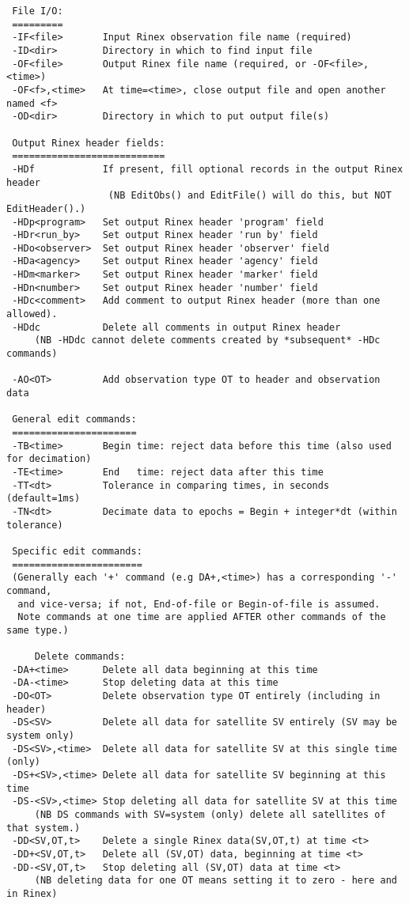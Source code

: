 \begin{\outputsize}
\begin{verbatim}
 File I/O:
 =========
 -IF<file>       Input Rinex observation file name (required)
 -ID<dir>        Directory in which to find input file
 -OF<file>       Output Rinex file name (required, or -OF<file>,<time>)
 -OF<f>,<time>   At time=<time>, close output file and open another named <f>
 -OD<dir>        Directory in which to put output file(s)

 Output Rinex header fields:
 ===========================
 -HDf            If present, fill optional records in the output Rinex header
                  (NB EditObs() and EditFile() will do this, but NOT EditHeader().)
 -HDp<program>   Set output Rinex header 'program' field
 -HDr<run_by>    Set output Rinex header 'run by' field
 -HDo<observer>  Set output Rinex header 'observer' field
 -HDa<agency>    Set output Rinex header 'agency' field
 -HDm<marker>    Set output Rinex header 'marker' field
 -HDn<number>    Set output Rinex header 'number' field
 -HDc<comment>   Add comment to output Rinex header (more than one allowed).
 -HDdc           Delete all comments in output Rinex header
     (NB -HDdc cannot delete comments created by *subsequent* -HDc commands)

 -AO<OT>         Add observation type OT to header and observation data

 General edit commands:
 ======================
 -TB<time>       Begin time: reject data before this time (also used for decimation)
 -TE<time>       End   time: reject data after this time
 -TT<dt>         Tolerance in comparing times, in seconds (default=1ms)
 -TN<dt>         Decimate data to epochs = Begin + integer*dt (within tolerance)

 Specific edit commands:
 =======================
 (Generally each '+' command (e.g DA+,<time>) has a corresponding '-' command,
  and vice-versa; if not, End-of-file or Begin-of-file is assumed.
  Note commands at one time are applied AFTER other commands of the same type.)

     Delete commands:
 -DA+<time>      Delete all data beginning at this time
 -DA-<time>      Stop deleting data at this time
 -DO<OT>         Delete observation type OT entirely (including in header)
 -DS<SV>         Delete all data for satellite SV entirely (SV may be system only)
 -DS<SV>,<time>  Delete all data for satellite SV at this single time (only)
 -DS+<SV>,<time> Delete all data for satellite SV beginning at this time
 -DS-<SV>,<time> Stop deleting all data for satellite SV at this time
     (NB DS commands with SV=system (only) delete all satellites of that system.)
 -DD<SV,OT,t>    Delete a single Rinex data(SV,OT,t) at time <t>
 -DD+<SV,OT,t>   Delete all (SV,OT) data, beginning at time <t>
 -DD-<SV,OT,t>   Stop deleting all (SV,OT) data at time <t>
     (NB deleting data for one OT means setting it to zero - here and in Rinex)


\end{verbatim}
\end{\outputsize}
